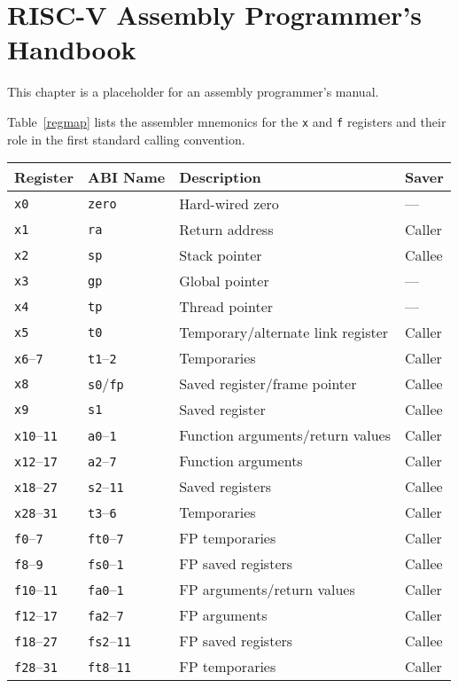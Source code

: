 \chapter{RISC-V Assembly Programmer's Handbook}
\label{assembly}

This chapter is a placeholder for an assembly programmer's manual.

Table~\ref{regmap} lists the assembler mnemonics for the {\tt x} and {\tt f}
registers and their role in the first standard calling convention.

\vspace{0.2in}
\begin{table*}[htbp]
\begin{center}
\begin{tabular}{|l|l|l|l|}

  \hline
  Register            & ABI Name            & Description        & Saver \\ \hline
  \tt x0              & \tt zero            & Hard-wired zero    & --- \\
  \tt x1              & \tt ra              & Return address     & Caller \\
  \tt x2              & \tt sp              & Stack pointer      & Callee \\
  \tt x3              & \tt gp              & Global pointer     & --- \\
  \tt x4              & \tt tp              & Thread pointer     & --- \\
  \tt x5              & {\tt t0}            & Temporary/alternate link register& Caller \\
  {\tt x6}--{\tt 7}   & {\tt t1}--{\tt 2}   & Temporaries        & Caller \\
  \tt x8              & {\tt s0}/\tt fp     & Saved register/frame pointer & Callee \\
  \tt x9              & {\tt s1}            & Saved register     & Callee \\
  {\tt x10}--{\tt 11} & {\tt a0}--{\tt 1}   & Function arguments/return values & Caller \\
  {\tt x12}--{\tt 17} & {\tt a2}--{\tt 7}   & Function arguments & Caller \\
  {\tt x18}--{\tt 27} & {\tt s2}--{\tt 11}  & Saved registers    & Callee \\
  {\tt x28}--{\tt 31} & {\tt t3}--{\tt 6}   & Temporaries        & Caller \\
  \hline
  {\tt f0}--{\tt 7}   & {\tt ft0}--{\tt 7}  & FP temporaries     & Caller \\
  {\tt f8}--{\tt 9}   & {\tt fs0}--{\tt 1}  & FP saved registers & Callee \\
  {\tt f10}--{\tt 11} & {\tt fa0}--{\tt 1}  & FP arguments/return values & Caller \\
  {\tt f12}--{\tt 17} & {\tt fa2}--{\tt 7}  & FP arguments       & Caller \\
  {\tt f18}--{\tt 27} & {\tt fs2}--{\tt 11} & FP saved registers & Callee \\
  {\tt f28}--{\tt 31} & {\tt ft8}--{\tt 11} & FP temporaries     & Caller \\
  \hline


\end{tabular}
\end{center}
\end{table*}
